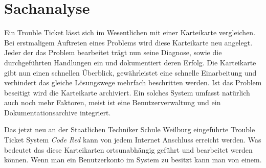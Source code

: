 \chapter{Sachanalyse}  %
\label{chapter:Sachanalyse}  %

Ein Trouble Ticket lässt sich im Wesentlichen mit einer Karteikarte vergleichen. Bei erstmaligem Auftreten eines Problems wird diese Karteikarte neu angelegt. Jeder der das Problem bearbeitet trägt nun seine Diagnose, sowie die durchgeführten Handlungen ein und dokumentiert deren Erfolg. Die Karteikarte gibt nun einen schnellen Überblick, gewährleistet eine schnelle Einarbeitung und verhindert das gleiche Lösungswege mehrfach beschritten werden. Ist das Problem beseitigt wird die Karteikarte archiviert.
Ein solches System umfasst natürlich auch noch mehr Faktoren, meist ist eine Benutzerverwaltung und ein Dokumentationsarchive integriert.

Das jetzt neu an der Staatlichen Techniker Schule Weilburg eingeführte Trouble Ticket System \textit{Code Red} kann von jedem Internet Anschluss erreicht werden. Was bedeutet das diese Karteikarten ortsunabhängig geführt und bearbeitet werden können. Wenn man ein Benutzerkonto im System zu besitzt kann man von einem. 

